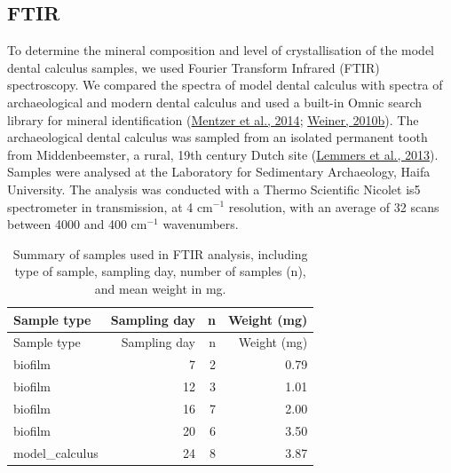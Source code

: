 \documentclass[
  b5paper,
]{book}
\begin{document}
\hypertarget{ftir}{%
\subsection{FTIR}\label{ftir}}

To determine the mineral composition and level of crystallisation of the
model dental calculus samples, we used Fourier Transform Infrared (FTIR)
spectroscopy. We compared the spectra of model dental calculus with
spectra of archaeological and modern dental calculus and used a built-in
Omnic search library for mineral identification
(\protect\hyperlink{ref-mentzerDistributionAuthigenic2014}{Mentzer et
al., 2014};
\protect\hyperlink{ref-weinerInfraredSpectroscopy2010}{Weiner, 2010b}).
The archaeological dental calculus was sampled from an isolated
permanent tooth from Middenbeemster, a rural, 19th century Dutch site
(\protect\hyperlink{ref-lemmersMiddenbeemster2013}{Lemmers et al.,
2013}). Samples were analysed at the Laboratory for Sedimentary
Archaeology, Haifa University. The analysis was conducted with a Thermo
Scientific Nicolet is5 spectrometer in transmission, at 4 cm\(^{-1}\)
resolution, with an average of 32 scans between 4000 and 400 cm\(^{-1}\)
wavenumbers.

\hypertarget{tbl-ftir-byoc}{}
\begin{longtable}[]{@{}lrrr@{}}
\caption{\label{tbl-ftir-byoc}Summary of samples used in FTIR analysis,
including type of sample, sampling day, number of samples (n), and mean
weight in mg.}\tabularnewline
\toprule\noalign{}
Sample type & Sampling day & n & Weight (mg) \\
\midrule\noalign{}
\endfirsthead
\toprule\noalign{}
Sample type & Sampling day & n & Weight (mg) \\
\midrule\noalign{}
\endhead
\bottomrule\noalign{}
\endlastfoot
biofilm & 7 & 2 & 0.79 \\
biofilm & 12 & 3 & 1.01 \\
biofilm & 16 & 7 & 2.00 \\
biofilm & 20 & 6 & 3.50 \\
model\_calculus & 24 & 8 & 3.87 \\
\end{longtable}
\end{document}
